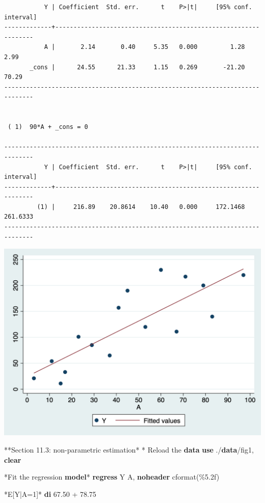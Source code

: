 \documentclass[
  10pt,
]{book}
\newenvironment{Shaded}{\begin{snugshade}}{\end{snugshade}}
\newcommand{\KeywordTok}[1]{\textcolor[rgb]{0.13,0.29,0.53}{\textbf{#1}}}
\newcommand{\NormalTok}[1]{#1}
\begin{document}
\begin{verbatim}
           Y | Coefficient  Std. err.      t    P>|t|     [95% conf. interval]
-------------+----------------------------------------------------------------
           A |       2.14       0.40     5.35   0.000         1.28        2.99
       _cons |      24.55      21.33     1.15   0.269       -21.20       70.29
------------------------------------------------------------------------------


 ( 1)  90*A + _cons = 0

------------------------------------------------------------------------------
           Y | Coefficient  Std. err.      t    P>|t|     [95% conf. interval]
-------------+----------------------------------------------------------------
         (1) |     216.89    20.8614    10.40   0.000     172.1468    261.6333
------------------------------------------------------------------------------
\end{verbatim}

\begin{center}\includegraphics[width=0.85\linewidth]{figs/stata-fig-11-4} \end{center}

\begin{Shaded}
\begin{Highlighting}[]
\NormalTok{**Section 11.3: non{-}parametric estimation*}
\NormalTok{* Reload the }\KeywordTok{data}
\KeywordTok{use}\NormalTok{ ./}\KeywordTok{data}\NormalTok{/fig1, }\KeywordTok{clear}

\NormalTok{*Fit the regression }\KeywordTok{model}\NormalTok{*}
\KeywordTok{regress}\NormalTok{ Y A, }\KeywordTok{noheader}\NormalTok{ cformat(\%5.2f)}

\NormalTok{*E[Y|A=1]*}
\KeywordTok{di}\NormalTok{ 67.50 + 78.75}
\end{Highlighting}
\end{Shaded}
\end{document}
